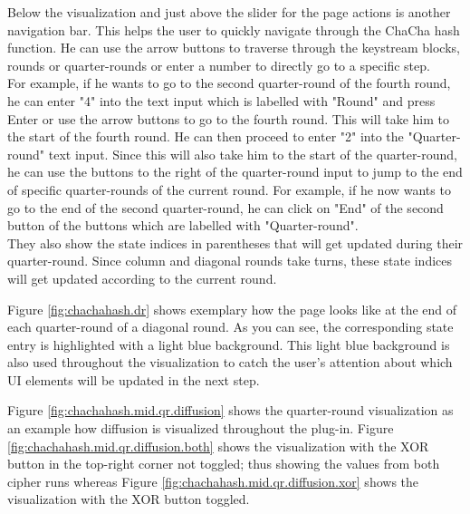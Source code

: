Below the visualization and just above the slider for the page actions is another navigation bar. This helps the user to quickly navigate through the ChaCha hash function. He can use the arrow buttons to traverse through the keystream blocks, rounds or quarter-rounds or enter a number to directly go to a specific step. \\
For example, if he wants to go to the second quarter-round of the fourth round, he can enter "4" into the text input which is labelled with "Round" and press Enter or use the arrow buttons to go to the fourth round. This will take him to the start of the fourth round. He can then proceed to enter "2" into the "Quarter-round" text input. Since this will also take him to the start of the quarter-round, he can use the buttons to the right of the quarter-round input to jump to the end of specific quarter-rounds of the current round. For example, if he now wants to go to the end of the second quarter-round, he can click on "End" of the second button of the buttons which are labelled with "Quarter-round". \\
They also show the state indices in parentheses that will get updated during their quarter-round. Since column and diagonal rounds take turns, these state indices will get updated according to the current round.

Figure \ref{fig:chachahash.dr} shows exemplary how the page looks like at the end of each quarter-round of a diagonal round. As you can see, the corresponding state entry is highlighted with a light blue background. This light blue background is also used throughout the visualization to catch the user's attention about which UI elements will be updated in the next step.

Figure \ref{fig:chachahash.mid.qr.diffusion} shows the quarter-round visualization as an example how diffusion is visualized throughout the plug-in. Figure \ref{fig:chachahash.mid.qr.diffusion.both} shows the visualization with the XOR button in the top-right corner not toggled; thus showing the values from both cipher runs whereas Figure \ref{fig:chachahash.mid.qr.diffusion.xor} shows the visualization with the XOR button toggled.

